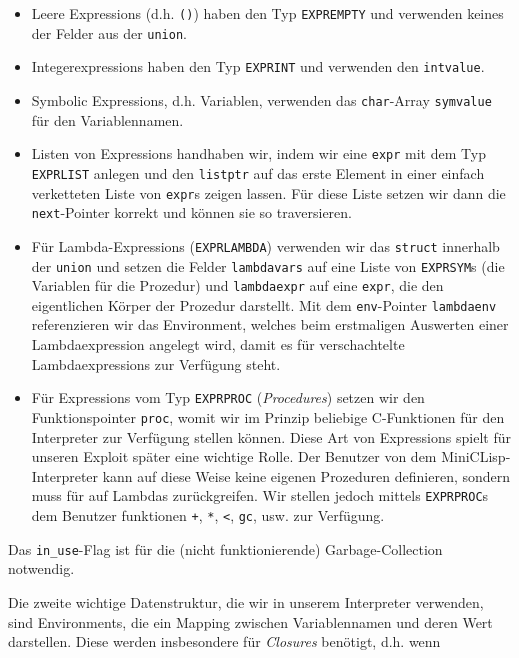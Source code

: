 \begin{itemize}
    \item Leere Expressions (d.h. \texttt{()}) haben den Typ \texttt{EXPREMPTY}
      und verwenden keines der Felder aus der \texttt{union}.
    \item Integerexpressions haben den Typ \texttt{EXPRINT} und verwenden den
      \texttt{intvalue}.
    \item Symbolic Expressions, d.h. Variablen, verwenden das
      \texttt{char}-Array \texttt{symvalue} für den Variablennamen.
    \item Listen von Expressions handhaben wir, indem wir eine \texttt{expr}
      mit dem Typ \texttt{EXPRLIST} anlegen und den \texttt{listptr} auf das
      erste Element in einer einfach verketteten Liste von \texttt{expr}s
      zeigen lassen. Für diese Liste setzen wir dann die \texttt{next}-Pointer
      korrekt und können sie so traversieren.
    \item Für Lambda-Expressions (\texttt{EXPRLAMBDA}) verwenden wir das
      \texttt{struct} innerhalb der \texttt{union} und setzen die Felder
      \texttt{lambdavars} auf eine Liste von \texttt{EXPRSYM}s (die Variablen
      für die Prozedur) und \texttt{lambdaexpr} auf eine \texttt{expr}, die
      den eigentlichen Körper der Prozedur darstellt. Mit dem \texttt{env}-Pointer
      \texttt{lambdaenv} referenzieren wir das Environment, welches beim
      erstmaligen Auswerten einer Lambdaexpression angelegt wird, damit es für
      verschachtelte Lambdaexpressions zur Verfügung steht.
    \item Für Expressions vom Typ \texttt{EXPRPROC} (\emph{Procedures}) setzen wir den
      Funktionspointer \texttt{proc}, womit wir im Prinzip beliebige
      C-Funktionen für den Interpreter zur Verfügung stellen können.
      Diese Art von Expressions spielt für unseren Exploit später eine
      wichtige Rolle.
      Der Benutzer von dem MiniCLisp-Interpreter kann auf diese Weise keine
      eigenen Prozeduren definieren, sondern muss für auf Lambdas
      zurückgreifen. Wir stellen jedoch mittels \texttt{EXPRPROC}s dem 
      Benutzer funktionen \texttt{+}, \texttt{*}, \texttt{<}, \texttt{gc}, usw.
      zur Verfügung.
\end{itemize}
Das \texttt{in\_use}-Flag ist für die (nicht funktionierende) Garbage-Collection
notwendig.
\par
Die zweite wichtige Datenstruktur, die wir in unserem Interpreter verwenden,
sind Environments, die ein Mapping zwischen Variablennamen und deren Wert
darstellen. Diese werden insbesondere für \emph{Closures} benötigt, d.h. wenn
